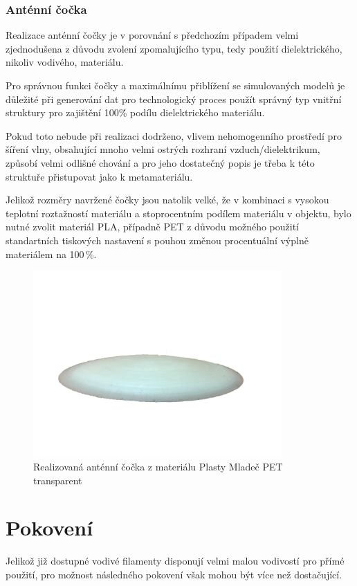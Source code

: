 \subsubsection{Anténní čočka}
Realizace anténní čočky je v porovnání s předchozím případem velmi zjednodušena z důvodu zvolení zpomalujícího typu, tedy použití dielektrického, nikoliv vodivého, materiálu.

Pro správnou funkci čočky a maximálnímu přiblížení se simulovaných modelů je důležité při generování dat pro technologický proces použít správný typ vnitřní struktury pro zajištění 100\.\% podílu dielektrického materiálu.

Pokud toto nebude při realizaci dodrženo, vlivem nehomogenního prostředí pro šíření vlny, obsahující mnoho velmi ostrých rozhraní vzduch/dielektrikum, způsobí velmi odlišné chování a pro jeho dostatečný popis je třeba k této struktuře přistupovat jako k metamateriálu.

Jelikož rozměry navržené čočky jsou natolik velké, že v kombinaci s vysokou teplotní roztažností materiálu a stoprocentním podílem materiálu v objektu, bylo nutné zvolit materiál PLA, případně PET z důvodu možného použití standartních tiskových nastavení s pouhou změnou procentuální výplně materiálem na 100\,\%.

\begin{figure}[!htbp]
\begin{center}
\includegraphics[width=9.5cm]{pics/final/lensReal}
\caption{Realizovaná anténní čočka z materiálu Plasty Mladeč PET transparent}
\label{fig:LensReal}
\end{center}
\end{figure}

\section{Pokovení}
Jelikož již dostupné vodivé filamenty disponují velmi malou vodivostí pro přímé použití, pro možnost následného pokovení však mohou být více než dostačující.

